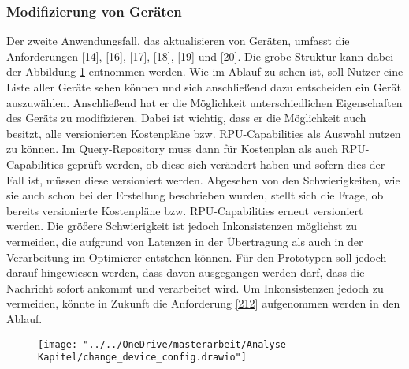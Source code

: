 \subsubsection{Modifizierung von Geräten}
Der zweite Anwendungsfall, das aktualisieren von Geräten, umfasst die Anforderungen \ref{14}, \ref{16}, \ref{17}, \ref{18}, \ref{19} und \ref{20}. Die grobe Struktur kann dabei der Abbildung \ref{fig:changedeviceconfig} entnommen werden.
Wie im Ablauf zu sehen ist, soll Nutzer eine Liste aller Geräte sehen können und sich anschließend dazu entscheiden ein Gerät auszuwählen. Anschließend hat er die Möglichkeit unterschiedlichen Eigenschaften des Geräts zu modifizieren. Dabei ist wichtig, dass er die Möglichkeit auch besitzt, alle versionierten Kostenpläne bzw. RPU-Capabilities als Auswahl nutzen zu können. Im Query-Repository muss dann für Kostenplan als auch RPU-Capabilities geprüft werden, ob diese sich verändert haben und sofern dies der Fall ist, müssen diese versioniert werden. 
Abgesehen von den Schwierigkeiten, wie sie auch schon bei der Erstellung beschrieben wurden, stellt sich die Frage, ob bereits versionierte Kostenpläne bzw. RPU-Capabilities erneut versioniert werden. Die größere Schwierigkeit ist jedoch Inkonsistenzen möglichst zu vermeiden, die aufgrund von Latenzen in der Übertragung als auch in der Verarbeitung im Optimierer entstehen können. Für den Prototypen soll jedoch darauf hingewiesen werden, dass davon ausgegangen werden darf, dass die Nachricht sofort ankommt und verarbeitet wird. Um Inkonsistenzen jedoch zu vermeiden, könnte in Zukunft die Anforderung \ref{212} aufgenommen werden in den Ablauf.


\begin{figure}[h!]
	\centering
	\texttt{[image: "../../OneDrive/masterarbeit/Analyse Kapitel/change\_device\_config.drawio"]}
	\caption{}
	\label{fig:changedeviceconfig}
\end{figure}

\newpage


